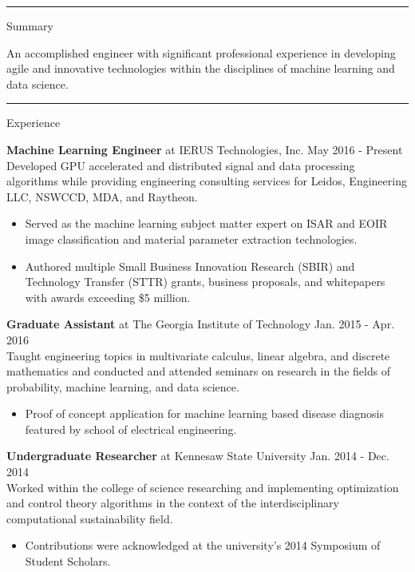 \documentclass[]{article}
\def \mysection[#1]{
\vspace{.3cm}
\hrule
\vspace{.3cm}
{\large #1 \par}
\vspace{.2cm}
}
\begin{document}
\par{\par} 

\vspace{.3cm}

\mysection[Summary] 
An accomplished engineer with significant professional experience in developing agile and innovative technologies within the disciplines of machine learning and data science.

\mysection[Experience]
\textbf{Machine Learning Engineer} at IERUS Technologies, Inc. \hfill May 2016 - Present\\
Developed GPU accelerated and distributed signal and data processing algorithms while providing engineering consulting services for Leidos, Engineering LLC, NSWCCD, MDA, and Raytheon. 

\begin{itemize}[leftmargin=*, topsep=.5em, itemsep=.25em]
\item Served as the machine learning subject matter expert on ISAR and EOIR image classification and material parameter extraction technologies. 
\item Authored multiple Small Business Innovation Research (SBIR) and Technology Transfer (STTR) grants, business proposals, and whitepapers with awards exceeding \$5 million. 
\end{itemize}

\textbf{Graduate Assistant} at The Georgia Institute of Technology \hfill Jan. 2015 - Apr. 2016\\
Taught engineering topics in multivariate calculus, linear algebra, and discrete mathematics and conducted and attended seminars on research in the fields of probability, machine learning, and data science.
\begin{itemize}[leftmargin=*, topsep=.5em, itemsep=.25em]
\item Proof of concept application for machine learning based disease diagnosis featured by school of electrical engineering.
\end{itemize}

\textbf{Undergraduate Researcher} at Kennesaw State University \hfill Jan. 2014 - Dec. 2014\\
Worked within the college of science researching and implementing optimization and control theory algorithms in the context of the interdisciplinary computational sustainability field.
\begin{itemize}[leftmargin=*, topsep=.5em, itemsep=.25em]
\item Contributions were acknowledged at the university's 2014 Symposium of Student Scholars.
\end{itemize}
\end{document}
